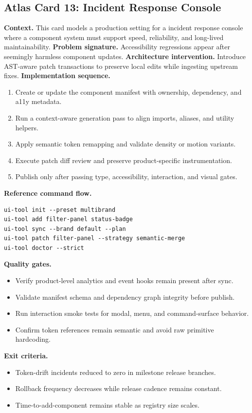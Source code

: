 \subsection*{Atlas Card 13: Incident Response Console}
\textbf{Context.} This card models a production setting for a incident response console where a component system must support speed, reliability, and long-lived maintainability.
\textbf{Problem signature.} Accessibility regressions appear after seemingly harmless component updates.
\textbf{Architecture intervention.} Introduce AST-aware patch transactions to preserve local edits while ingesting upstream fixes.
\textbf{Implementation sequence.}
\begin{enumerate}[leftmargin=*, itemsep=0.28em]
  \item Create or update the component manifest with ownership, dependency, and a11y metadata.
  \item Run a context-aware generation pass to align imports, aliases, and utility helpers.
  \item Apply semantic token remapping and validate density or motion variants.
  \item Execute patch diff review and preserve product-specific instrumentation.
  \item Publish only after passing type, accessibility, interaction, and visual gates.
\end{enumerate}
\textbf{Reference command flow.}
\begin{verbatim}
ui-tool init --preset multibrand
ui-tool add filter-panel status-badge
ui-tool sync --brand default --plan
ui-tool patch filter-panel --strategy semantic-merge
ui-tool doctor --strict
\end{verbatim}
\textbf{Quality gates.}
\begin{itemize}[leftmargin=*, itemsep=0.24em]
  \item Verify product-level analytics and event hooks remain present after sync.
  \item Validate manifest schema and dependency graph integrity before publish.
  \item Run interaction smoke tests for modal, menu, and command-surface behavior.
  \item Confirm token references remain semantic and avoid raw primitive hardcoding.
\end{itemize}
\textbf{Exit criteria.}
\begin{itemize}[leftmargin=*, itemsep=0.24em]
  \item Token-drift incidents reduced to zero in milestone release branches.
  \item Rollback frequency decreases while release cadence remains constant.
  \item Time-to-add-component remains stable as registry size scales.
\end{itemize}
\clearpage
